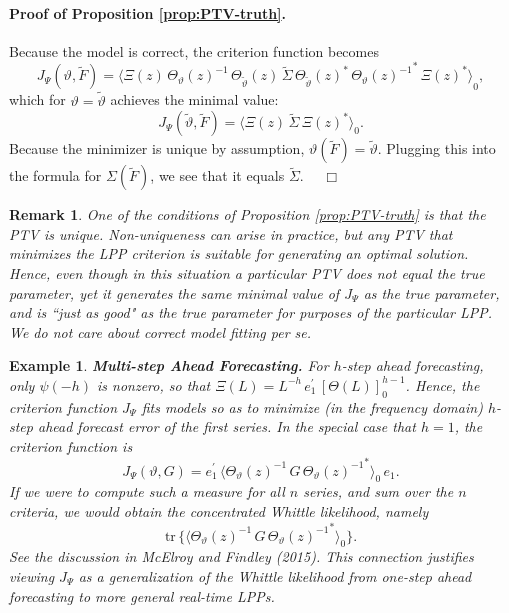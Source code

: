 \documentclass[a4paper]{book}
\newtheorem{Example}{Example}
\newtheorem{Remark}{Remark}
\begin{document}
\paragraph{Proof of Proposition \ref{prop:PTV-truth}.}
 Because the model is correct, the criterion function becomes
\[
  J_{\Psi} (\vartheta, \widetilde{F}) = { \langle \Xi (z) \, { \Theta_{\vartheta   } (z) }^{-1} \, 
   \Theta_{\widetilde{\vartheta}} (z) \, \widetilde{\Sigma} \, 
  {\Theta_{\widetilde{\vartheta}} (z)  }^* \, { { \Theta_{\vartheta  } (z) }^{-1} }^*
 \, { \Xi (z) }^* \rangle }_0,
\]
 which for $\vartheta = \widetilde{\vartheta}$ achieves the minimal value:
\[
  J_{\Psi} (\widetilde{\vartheta}, \widetilde{F})  ={ \langle \Xi (z) \,   \widetilde{\Sigma} \, 
   { \Xi (z) }^* \rangle }_0.
\]
  Because the minimizer is unique by assumption, $\vartheta (\widetilde{F}) = \widetilde{\vartheta} $. 
  Plugging this into the formula
 for $\Sigma (\widetilde{F})$, we see that it equals $\widetilde{\Sigma}$.  $\quad \Box$

\vspace{.5cm}


\begin{Remark} \rm  
\label{rem:PTVunique}
 One of the conditions of Proposition \ref{prop:PTV-truth} is that the PTV is unique.  
 Non-uniqueness can arise in practice, but any PTV that minimizes the LPP criterion 
 is suitable for generating an optimal solution.  Hence, even though in this situation
 a particular PTV does not equal the true parameter, yet it generates the same minimal
 value of $J_{\Psi}$ as the true parameter, and is ``just as good" as the true parameter
 for purposes of the particular LPP.  We do not care about correct model fitting {\it per se}.
\end{Remark}


\begin{Example} {\bf Multi-step Ahead Forecasting.}  \rm
\label{exam:multi-step.fore.3}
 For $h$-step ahead forecasting, only $\psi (-h)$
  is nonzero, so that
 $\Xi (L) =  L^{-h} \,  e_1^{\prime} \, {[ \Theta (L) ]}_0^{ h - 1}$. 
  Hence, the criterion function $J_{\Psi} $ fits models so as to minimize
 (in the frequency domain)  $h$-step ahead forecast error of the first series. 
 In the special case that $h=1$, the criterion function is
\[
 J_{\Psi} (\vartheta, G) =  e_1^{\prime} \, { \langle   { \Theta_{\vartheta   } (z) }^{-1}  \,
  G \, { { \Theta_{\vartheta  } (z) }^{-1} }^*  \rangle }_0 \, e_1.
\]
   If we were to compute such a measure for all $n$ series, and sum over the $n$ criteria, we would obtain the concentrated Whittle 
 likelihood, namely
\[
  \mbox{tr} \, \{  { \langle   { \Theta_{\vartheta   } (z) }^{-1}  \, G \,
  { { \Theta_{\vartheta  } (z) }^{-1} }^*  \rangle }_0 \}.
\]
  See the discussion in McElroy and Findley (2015).  This connection justifies viewing $J_{\Psi}$ as a generalization of the Whittle
 likelihood from one-step ahead forecasting to more general real-time LPPs.
\end{Example}
\end{document}
